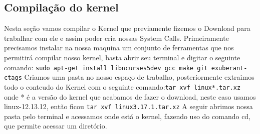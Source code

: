 \documentclass[12pt]{article}
\begin{document}
\subsection{Compilação do kernel}
	Nesta seção vamos compilar o Kernel que previamente fizemos o Download para trabalhar com ele e assim poder cria nossas System Calls.
	Primeiramente precisamos instalar na nossa maquina um conjunto de ferramentas que nos permitirá compilar nosso kernel, basta abrir seu terminal e digitar o seguinte comando:\newline
	\verb!sudo apt-­get install libncurses5­dev gcc make git exuberant­ctags! 
	\newline
	Criamos uma pasta no nosso espaço de trabalho, posteriormente extraimos todo o conteudo do Kernel com o seguinte comando:\newline \verb!tar xvf linux­­*.tar.xz! \newline onde * é a versão do kernel que acabamos de fazer o download, neste caso usamos linux-12.13.12, então ficou\newline
	\verb!tar xvf linux­3.17.1.tar.xz!\newline
	A seguir abrimos nossa pasta pelo terminal e acessamos onde está o kernel, fazendo uso do comando cd, que permite acessar um diretório.
\end{document}
